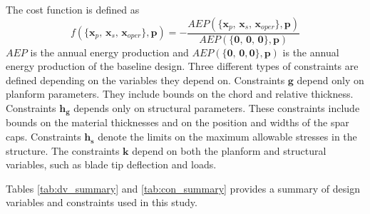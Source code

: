 The cost function is defined as
\begin{equation}
f(\{\mathbf{x}_p,\,
	\mathbf{x}_s,\,
	\mathbf{x}_{oper}\},
	\mathbf{p}) = -\frac{AEP(\{\mathbf{x}_p,\,
						  		 \mathbf{x}_s,\,
						  		 \mathbf{x}_{oper}\},
						  		 \mathbf{p})}
						  {AEP(\{\mathbf{0},\,
								\mathbf{0},\,
								\mathbf{0}\},
								\mathbf{p})}	
\label{eqn:objective}
\end{equation}
$AEP$ is the annual energy production and $AEP(\{\mathbf{0},\,\mathbf{0},\mathbf{0}\}, \mathbf{p})$ is the annual energy production of the baseline design.
Three different types of constraints are defined depending on the variables they depend on. 
Constraints $\mathbf{g}$ depend only on planform parameters. 
They include bounds on the chord and relative thickness. 
Constraints $\mathbf{h_g}$ depends only on structural parameters.
These constraints include bounds on the material thicknesses and on the position and widths of the spar caps. 
Constraints $\mathbf{h_s}$ denote the limits on the maximum allowable stresses in the structure.
The constraints $\mathbf{k}$ depend on both the planform and structural variables, such as blade tip deflection and loads.

Tables \ref{tab:dv_summary} and \ref{tab:con_summary} provides a summary of design variables and constraints used in this study.

